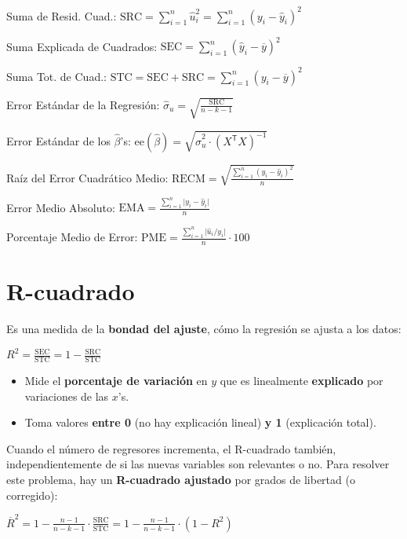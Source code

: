 \documentclass[10pt, a4paper, landscape]{extarticle}
\newcommand{\se}{\mathrm{ee}}
\newcommand{\SSR}{\mathrm{SRC}}
\newcommand{\SSE}{\mathrm{SEC}}
\newcommand{\SST}{\mathrm{STC}}
\newcommand{\tr}{\mathsf{T}}
\begin{document}
\begin{multicols}{3}
Suma de Resid. Cuad.: \hfill $\SSR = \sum_{i=1}^n \hat{u}_i^2 = \sum_{i=1}^n (y_i - \hat{y}_i)^2$

Suma Explicada de Cuadrados: \hfill $\SSE = \sum_{i=1}^n (\hat{y}_i - \overline{y})^2$

Suma Tot. de Cuad.: \hfill $\SST = \SSE + \SSR = \sum_{i=1}^n (y_i - \overline{y})^2$

Error Estándar de la Regresión: \hfill $\hat{\sigma}_u = \sqrt{\frac{\SSR}{n - k - 1}}$

Error Estándar de los $\hat{\beta}$'s: \hfill $\se(\hat{\beta}) = \sqrt{\hat{\sigma}^2_u \cdot (X^\tr X)^{-1}}$

Raíz del Error Cuadrático Medio: \hfill $\mathrm{RECM} = \sqrt{\frac{\sum_{i=1}^n (y_i - \hat{y}_i)^2}{n}}$

Error Medio Absoluto: \hfill $\mathrm{EMA} = \frac{\sum_{i=1}^n \lvert y_i - \hat{y}_i \rvert}{n}$

Porcentaje Medio de Error: \hfill $\mathrm{PME} = \frac{\sum_{i=1}^n \lvert \hat{u}_i / y_i \rvert}{n} \cdot 100$

\columnbreak

\section*{R-cuadrado}

Es una medida de la \textbf{bondad del ajuste}, cómo la regresión se ajusta a los datos:

\begin{center}
	$R^2 = \frac{\SSE}{\SST} = 1 - \frac{\SSR}{\SST}$
\end{center}

\begin{itemize}[leftmargin=*]
	\item Mide el \textbf{porcentaje de variación} en $y$ que es linealmente \textbf{explicado} por variaciones de las $x$'s.
	\item Toma valores \textbf{entre 0} (no hay explicación lineal) \textbf{y 1} (explicación total).
\end{itemize}

Cuando el número de regresores incrementa, el R-cuadrado también, independientemente de si las nuevas variables son relevantes o no. Para resolver este problema, hay un \textbf{R-cuadrado ajustado} por grados de libertad (o corregido):

\begin{center}
	$\overline{R}^2 = 1 - \frac{n - 1}{n - k - 1} \cdot \frac{\SSR}{\SST} = 1 - \frac{n - 1}{n - k - 1} \cdot (1 - R^2)$
\end{center}


\end{multicols}
\end{document}
